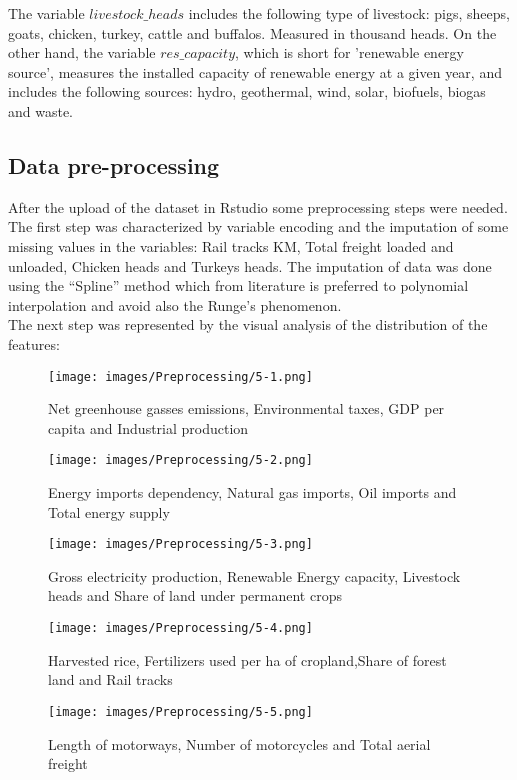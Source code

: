 \documentclass[12pt]{article}
\begin{document}
The variable $livestock\_heads$ includes the following type of livestock: pigs, sheeps, goats, chicken, turkey, cattle and buffalos. Measured in thousand heads. On the other hand, the variable $res\_capacity$, which is short for 'renewable energy source', measures the installed capacity of renewable energy at a given year, and includes the following sources: hydro, geothermal, wind, solar, biofuels, biogas and waste. \\

\clearpage
\subsection{Data pre-processing} \label{Data pre-processing}
After the upload of the dataset in Rstudio some preprocessing steps were needed.\\

The first step was characterized by variable encoding and the imputation of some missing values in the variables: Rail tracks KM, Total freight loaded and unloaded, Chicken heads and Turkeys heads.
The imputation of data was done using the “Spline” method which from literature is preferred to polynomial interpolation and avoid also the Runge’s phenomenon.\\
The next step was represented by the visual analysis of the distribution of the features: \\

 \begin{figure}[H]
    \centering
    \texttt{[image: images/Preprocessing/5-1.png]}
    \caption{Net greenhouse gasses emissions, Environmental taxes, GDP per capita and Industrial production}
    \label{fig:Fig3}
\end{figure}
\begin{figure}[H]
    \centering
    \texttt{[image: images/Preprocessing/5-2.png]}
    \caption{Energy imports dependency, Natural gas imports, Oil imports and Total energy supply}
    \label{fig:Fig4}
\end{figure}
\begin{figure}[H]
    \centering
    \texttt{[image: images/Preprocessing/5-3.png]}
    \caption{Gross electricity production, Renewable Energy capacity, Livestock heads and Share of land under permanent crops}
    \label{fig:Fig5}
\end{figure}
\begin{figure}[H]
    \centering
    \texttt{[image: images/Preprocessing/5-4.png]}
    \caption{Harvested rice, Fertilizers used per ha of cropland,Share of forest land and Rail tracks}
    \label{fig:Fig6}
\end{figure}
\begin{figure}[H]
    \centering
    \texttt{[image: images/Preprocessing/5-5.png]}
    \caption{Length of motorways, Number of motorcycles and Total aerial freight}
    \label{fig:Fig7}
\end{figure}
\end{document}
